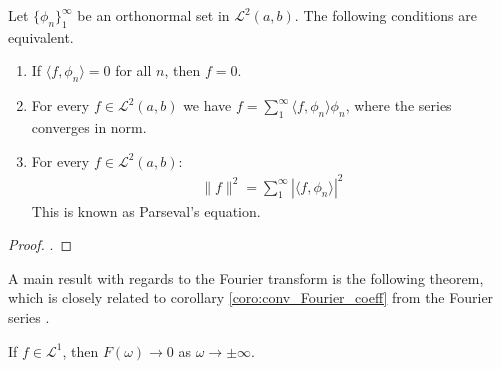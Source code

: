 \begin{theorem} \label{theo:Fourier_series_Parseval}
Let $\{\phi_n\}_1^\infty$ be an orthonormal set in $\mathcal{L}^2(a,b)$. The following conditions are equivalent.
\begin{enumerate}[label=(\alph*)]
\item If $\langle f, \phi_n \rangle = 0$ for all $n$, then $f = 0$.
\item For every $f \in \mathcal{L}^2(a,b)$ we have $f = \sum_1^\infty \langle f, \phi_n \rangle \phi_n$, where the series converges in norm.\\
\item For every $f \in \mathcal{L}^2(a,b)$:
\begin{align*}
\|f\|^2 = \sum_1^\infty |\langle f,\phi_n \rangle|^2
\end{align*}
This is known as Parseval's equation.
\end{enumerate}
\end{theorem}

\begin{proof}
.
\end{proof}

A main result with regards to the Fourier transform is the following theorem, which is closely related to corollary \ref{coro:conv_Fourier_coeff} from the Fourier series \cite{page 217, FAA}.

\begin{theorem}
If $f \in \mathcal{L}^1$, then $F(\omega) \to 0$ as $\omega \to \pm \infty$.
\end{theorem}


